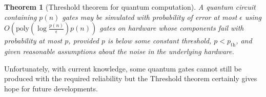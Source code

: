 \documentclass{article}
\newtheorem{theorem}{Theorem}
\begin{document}
\newpage

\begin{theorem}[Threshold theorem for quantum computation]
	A quantum circuit containing $p(n)$ gates may be simulated with probability of error at most $\epsilon$ using
	$O\left(\text{poly}\left(\log \frac{p(n)}{\epsilon}\right)p(n)\right)$
	gates on hardware whose components fail with probability at most $p$, provided $p$ is
	below some constant threshold, $p < p_{\text{th}}$, and given reasonable assumptions about
	the noise in the underlying hardware.
\end{theorem}

Unfortunately, with current knowledge, some quantum gates cannot still be produced with
the required reliability but the Threshold theorem certainly gives hope for future developments.
\end{document}
